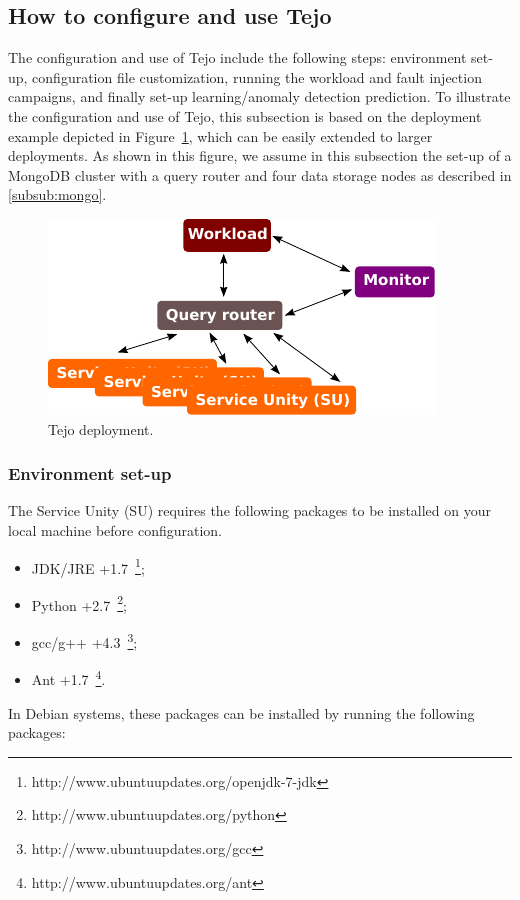 \subsection{How to configure and use Tejo}
\label{subsec:conftejo}

The configuration and use of Tejo include the following steps: environment set-up, configuration file customization, running the workload and fault injection campaigns, and finally set-up learning/anomaly detection prediction. To illustrate the configuration and use of Tejo, this subsection is based on the deployment example depicted in Figure~\ref{fig:tejo_cluster}, which can be easily extended to larger deployments. As shown in this figure, we assume in this subsection the set-up of a MongoDB cluster with a query router and four data storage nodes as described in \ref{subsub:mongo}.

\begin{figure}[!h]
  \centering
     \includegraphics[width=.6\textwidth]{inputs/img/tejo_cluster}
  \caption{Tejo deployment.}
  \label{fig:tejo_cluster}
\end{figure}

\subsubsection{Environment set-up}

The Service Unity (SU) requires the following packages to be installed on your local machine before configuration.

\begin{itemize}
	\item JDK/JRE +1.7~\footnote{http://www.ubuntuupdates.org/openjdk-7-jdk};
	\item Python +2.7~\footnote{http://www.ubuntuupdates.org/python};
	\item gcc/g++ +4.3~\footnote{http://www.ubuntuupdates.org/gcc};
	\item Ant +1.7~\footnote{http://www.ubuntuupdates.org/ant}.
\end{itemize}

In Debian systems, these packages can be installed by running the following packages:

